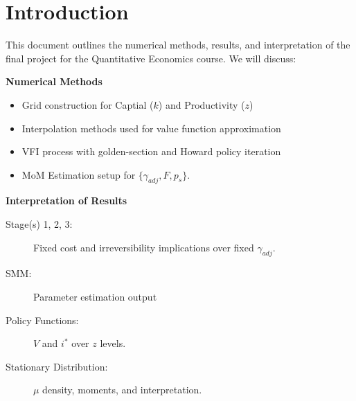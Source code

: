 \section{Introduction}
This document outlines the numerical methods, results, and interpretation of the final project for the Quantitative Economics course.
We will discuss:

\vspace{\baselineskip}

\noindent\textbf{Numerical Methods}
\begin{itemize}
    \item Grid construction for Captial ($k$) and Productivity ($z$)
    \item Interpolation methods used for value function approximation
    \item VFI process with golden-section and Howard policy iteration
    \item MoM Estimation setup for $\{\gamma_{adj}, F, p_s\}$.
\end{itemize}

\vspace{\baselineskip}

\noindent\textbf{Interpretation of Results}
\begin{description}
    \item[Stage(s) 1, 2, 3:] Fixed cost and irreversibility implications over fixed $\gamma_{adj}$.
    \item[SMM:] Parameter estimation output
    \item[Policy Functions:] $V$ and $i^*$ over $z$ levels.
    \item[Stationary Distribution:] $\mu$ density, moments, and interpretation.  
\end{description}